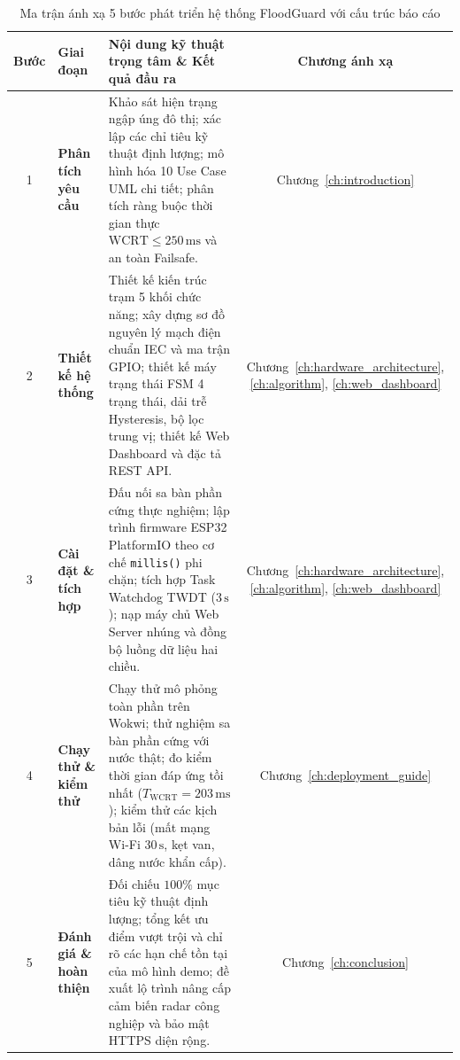 \begin{table}[H]
\centering
\small
\renewcommand{\arraystretch}{1.15}
\caption{Ma trận ánh xạ 5 bước phát triển hệ thống FloodGuard với cấu trúc báo cáo}
\label{tab:development_process_mapping}
\begin{tabularx}{\textwidth}{|c|>{\bfseries}p{2.6cm}|X|c|}
\hline
\textbf{Bước} & \textbf{Giai đoạn} & \textbf{Nội dung kỹ thuật trọng tâm \& Kết quả đầu ra} & \textbf{Chương ánh xạ} \\ \hline
1 & Phân tích yêu cầu & Khảo sát hiện trạng ngập úng đô thị; xác lập các chỉ tiêu kỹ thuật định lượng; mô hình hóa 10 Use Case UML chi tiết; phân tích ràng buộc thời gian thực $\text{WCRT} \le 250\,\text{ms}$ và an toàn Failsafe. & Chương~\ref{ch:introduction} \\ \hline
2 & Thiết kế hệ thống & Thiết kế kiến trúc trạm 5 khối chức năng; xây dựng sơ đồ nguyên lý mạch điện chuẩn IEC và ma trận GPIO; thiết kế máy trạng thái FSM 4 trạng thái, dải trễ Hysteresis, bộ lọc trung vị; thiết kế Web Dashboard và đặc tả REST API. & Chương~\ref{ch:hardware_architecture}, \ref{ch:algorithm}, \ref{ch:web_dashboard} \\ \hline
3 & Cài đặt \& tích hợp & Đấu nối sa bàn phần cứng thực nghiệm; lập trình firmware ESP32 PlatformIO theo cơ chế \lstinline|millis()| phi chặn; tích hợp Task Watchdog TWDT ($3\,\text{s}$); nạp máy chủ Web Server nhúng và đồng bộ luồng dữ liệu hai chiều. & Chương~\ref{ch:hardware_architecture}, \ref{ch:algorithm}, \ref{ch:web_dashboard} \\ \hline
4 & Chạy thử \& kiểm thử & Chạy thử mô phỏng toàn phần trên Wokwi; thử nghiệm sa bàn phần cứng với nước thật; đo kiểm thời gian đáp ứng tồi nhất ($T_{\text{WCRT}} = 203\,\text{ms}$); kiểm thử các kịch bản lỗi (mất mạng Wi-Fi $30\,\text{s}$, kẹt van, dâng nước khẩn cấp). & Chương~\ref{ch:deployment_guide} \\ \hline
5 & Đánh giá \& hoàn thiện & Đối chiếu $100\%$ mục tiêu kỹ thuật định lượng; tổng kết ưu điểm vượt trội và chỉ rõ các hạn chế tồn tại của mô hình demo; đề xuất lộ trình nâng cấp cảm biến radar công nghiệp và bảo mật HTTPS diện rộng. & Chương~\ref{ch:conclusion} \\ \hline
\end{tabularx}
\end{table}


